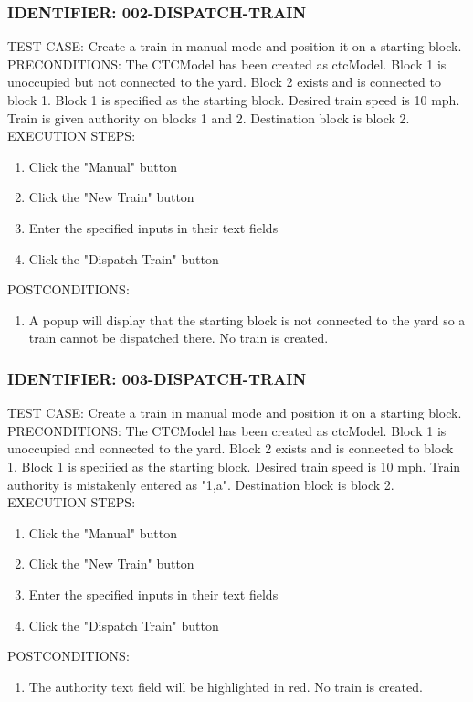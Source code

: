 \documentclass{scrreprt}
\begin{document}
\subsubsection{IDENTIFIER: 002-DISPATCH-TRAIN}
TEST CASE: Create a train in manual mode and position it on a starting block.
PRECONDITIONS: The CTCModel has been created as ctcModel. Block 1 is unoccupied but not connected to the yard. Block 2 exists and is connected to block 1. Block 1 is specified as the starting block. Desired train speed is 10 mph. Train is given authority on blocks 1 and 2. Destination block is block 2.
EXECUTION STEPS:
\begin{enumerate}
	\item Click the "Manual" button
	\item Click the "New Train" button
	\item Enter the specified inputs in their text fields
	\item Click the "Dispatch Train" button
\end{enumerate}
POSTCONDITIONS:
\begin{enumerate}
	\item A popup will display that the starting block is not connected to the yard so a train cannot be dispatched there. No train is created.
\end{enumerate}

\subsubsection{IDENTIFIER: 003-DISPATCH-TRAIN}
TEST CASE: Create a train in manual mode and position it on a starting block.
PRECONDITIONS: The CTCModel has been created as ctcModel. Block 1 is unoccupied and connected to the yard. Block 2 exists and is connected to block 1. Block 1 is specified as the starting block. Desired train speed is 10 mph. Train authority is mistakenly entered as "1,a". Destination block is block 2.
EXECUTION STEPS:
\begin{enumerate}
	\item Click the "Manual" button
	\item Click the "New Train" button
	\item Enter the specified inputs in their text fields
	\item Click the "Dispatch Train" button
\end{enumerate}
POSTCONDITIONS:
\begin{enumerate}
	\item The authority text field will be highlighted in red. No train is created.
\end{enumerate}
\end{document}
